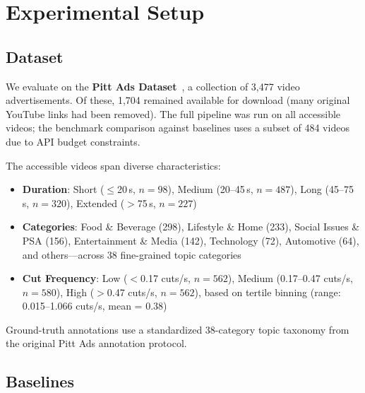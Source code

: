 \section{Experimental Setup}
\label{sec:experiments}

\subsection{Dataset}

We evaluate on the \textbf{Pitt Ads Dataset}~\cite{hussain2017automatic}, a collection of 3,477 video advertisements. Of these, 1,704 remained available for download (many original YouTube links had been removed). The full pipeline was run on all accessible videos; the benchmark comparison against baselines uses a subset of 484 videos due to API budget constraints.

The accessible videos span diverse characteristics:
\begin{itemize}
    \item \textbf{Duration}: Short ($\leq$20\,s, $n{=}98$), Medium (20--45\,s, $n{=}487$), Long (45--75\,s, $n{=}320$), Extended ($>$75\,s, $n{=}227$)
    \item \textbf{Categories}: Food \& Beverage (298), Lifestyle \& Home (233), Social Issues \& PSA (156), Entertainment \& Media (142), Technology (72), Automotive (64), and others---across 38 fine-grained topic categories
    \item \textbf{Cut Frequency}: Low ($<$0.17 cuts/s, $n{=}562$), Medium (0.17--0.47 cuts/s, $n{=}580$), High ($>$0.47 cuts/s, $n{=}562$), based on tertile binning (range: 0.015--1.066 cuts/s, mean = 0.38)
\end{itemize}

Ground-truth annotations use a standardized 38-category topic taxonomy from the original Pitt Ads annotation protocol.

\subsection{Baselines}

